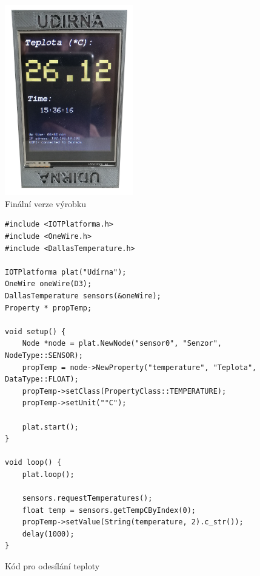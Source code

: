 \begin{figure}[htbp]
    \centering
    \includegraphics[width=0.5\textwidth]{img/smokehouse.png}
    \caption{\label{smokehouse}Finální verze výrobku}
\end{figure}

\begin{figure}[h!tb]
    \begin{verbatim}
#include <IOTPlatforma.h>
#include <OneWire.h>
#include <DallasTemperature.h>

IOTPlatforma plat("Udírna");
OneWire oneWire(D3);
DallasTemperature sensors(&oneWire);
Property * propTemp;

void setup() {
    Node *node = plat.NewNode("sensor0", "Senzor", NodeType::SENSOR);
    propTemp = node->NewProperty("temperature", "Teplota", DataType::FLOAT);
    propTemp->setClass(PropertyClass::TEMPERATURE);
    propTemp->setUnit("°C");

    plat.start();
}

void loop() {
    plat.loop();

    sensors.requestTemperatures();
    float temp = sensors.getTempCByIndex(0);
    propTemp->setValue(String(temperature, 2).c_str());
    delay(1000);
}
\end{verbatim}
    \caption{\label{code}Kód pro odesílání teploty}
\end{figure}